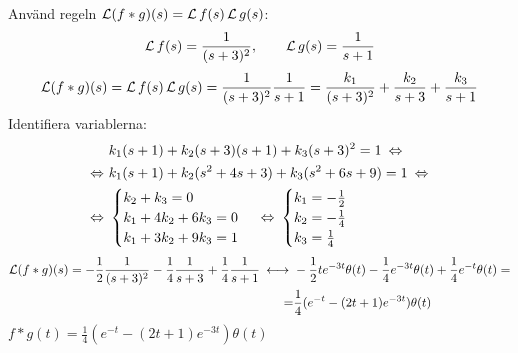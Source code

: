 \begin{task}{6.6}
	Använd regeln $\laplace (f*g)(s)=\laplace f(s)\*\laplace g(s)$:
	\[\operatorname{\mathcal{L}} f(s)=\frac{1}{(s+3)^2},\qquad
	\operatorname{\mathcal{L}} g(s)=\frac{1}{s+1}\]
	\begin{align*}
	\laplace(f*g)(s)=
	\laplace f(s)\*\laplace g(s)=
	\frac{1}{(s+3)^2}\*\frac{1}{s+1}=
	\frac{k_1}{(s+3)^2}+\frac{k_2}{s+3}+\frac{k_3}{s+1}
	\end{align*}
	Identifiera variablerna:
	\begin{align*}
	&k_1(s+1)+k_2(s+3)(s+1)+k_3(s+3)^2=1 \lra \\ \lra
	&k_1(s+1)+k_2(s^2+4s+3)+k_3(s^2+6s+9)=1 \lra \\ \lra
	&\begin{cases}
	k_2+k_3=0 \\
	k_1+4k_2+6k_3=0 \\
	k_1+3k_2+9k_3=1
	\end{cases} \lra
	\begin{cases}
	k_1=-\frac{1}{2} \\
	k_2=-\frac{1}{4} \\
	k_3=\frac{1}{4}
	\end{cases}
	\end{align*}
	\begin{align*}
	\laplace (f*g)(s)=
	-\frac{1}{2}\*\frac{1}{(s+3)^2}-\frac{1}{4}\*\frac{1}{s+3}+\frac{1}{4}\*\frac{1}{s+1} \llra
	&-\frac{1}{2}te^{-3t}\theta(t)-\frac{1}{4}e^{-3t}\theta(t)+\frac{1}{4}e^{-t}\theta(t)= \\ =
	&\frac{1}{4}(e^{-t}-(2t+1)e^{-3t})\theta(t)
	\end{align*}
	\ans $f*g(t)=\frac{1}{4}(e^{-t}-(2t+1)e^{-3t})\theta(t)$
\end{task}